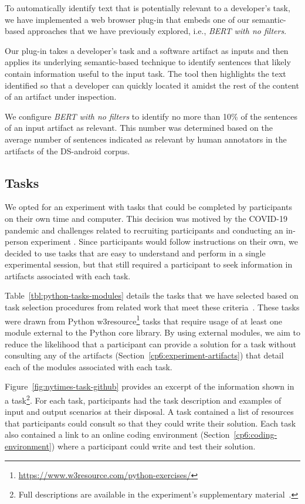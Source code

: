 To automatically identify text that is potentially relevant to a developer's task, we have implemented 
a web browser plug-in that embeds one of our semantic-based approaches that we have previously explored, i.e., \textit{BERT with no filters}.


Our plug-in takes a developer's task and a software artifact as inputs and then applies its underlying semantic-based technique  to identify sentences that likely contain information useful to the input task.
The tool then highlights the text identified so that a developer can quickly located it amidst the rest of the content of an artifact  under inspection. 


We configure \textit{BERT with no filters} to identify no more than 10\% of the sentences of an input artifact as relevant.
This number was determined based on the average number of sentences indicated as relevant by human annotators in the artifacts of the \acs{DS-android} corpus.


\subsection{Tasks}
\label{cp6:tasks}


We opted for an experiment with tasks that could be completed by participants on their own time and computer.
This decision was motived by the COVID-19 pandemic and challenges related to recruiting participants and conducting an in-person experiment . 
Since participants would follow instructions on their own, we decided to use tasks that are easy to understand and perform in a single experimental session, but that still required a participant  
to seek information in artifacts associated with each task.


Table~\ref{tbl:python-tasks-modules} details the tasks that we have selected based on task selection procedures from related work that meet these criteria~\cite{thiselton2019}. 
These tasks were drawn from
Python w3resource\footnote{\url{https://www.w3resource.com/python-exercises/}} tasks
that require usage of at least one module external to the Python core library.
By using external modules, we aim to reduce the likelihood that a participant 
can provide a solution for a task without consulting any of the artifacts (Section~\ref{cp6:experiment-artifacts})
that detail each of the modules associated with each task. 


Figure~\ref{fig:nytimes-task-github} provides an excerpt of the information shown in a task\footnote{Full descriptions are available in the experiment's supplementary material~.}.
For each task, participants had the task description and examples of input and output scenarios at their disposal. A task contained a list of resources that participants could consult 
so that they could write their solution.
Each task also contained a link to an online coding environment (Section~\ref{cp6:coding-environment})
where a participant could write and test their solution. 


